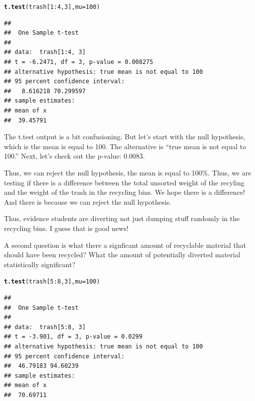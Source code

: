 \documentclass{tufte-handout}\usepackage[]{graphicx}\usepackage[]{color}
\makeatletter
\newcommand{\hlnum}[1]{\textcolor[rgb]{0.686,0.059,0.569}{#1}}%
\newcommand{\hlopt}[1]{\textcolor[rgb]{0,0,0}{#1}}%
\newcommand{\hlstd}[1]{\textcolor[rgb]{0.345,0.345,0.345}{#1}}%
\newcommand{\hlkwc}[1]{\textcolor[rgb]{0.333,0.667,0.333}{#1}}%
\newcommand{\hlkwd}[1]{\textcolor[rgb]{0.737,0.353,0.396}{\textbf{#1}}}%
\newenvironment{kframe}{%
 \def\at@end@of@kframe{}%
 \ifinner\ifhmode%
  \def\at@end@of@kframe{\end{minipage}}%
  \begin{minipage}{\columnwidth}%
 \fi\fi%
 \def\FrameCommand##1{\hskip\@totalleftmargin \hskip-\fboxsep
 \colorbox{shadecolor}{##1}\hskip-\fboxsep
     \hskip-\linewidth \hskip-\@totalleftmargin \hskip\columnwidth}%
 \MakeFramed {\advance\hsize-\width
   \@totalleftmargin\z@ \linewidth\hsize
   \@setminipage}}%
 {\par\unskip\endMakeFramed%
 \at@end@of@kframe}
\newenvironment{knitrout}{}{} %
\makeatother
\begin{document}
\begin{knitrout}
\color{fgcolor}\begin{kframe}
\begin{alltt}
\hlkwd{t.test}\hlstd{(trash[}\hlnum{1}\hlopt{:}\hlnum{4}\hlstd{,}\hlnum{3}\hlstd{],} \hlkwc{mu}\hlstd{=}\hlnum{100}\hlstd{)}
\end{alltt}
\begin{verbatim}
## 
## 	One Sample t-test
## 
## data:  trash[1:4, 3]
## t = -6.2471, df = 3, p-value = 0.008275
## alternative hypothesis: true mean is not equal to 100
## 95 percent confidence interval:
##   8.616218 70.299597
## sample estimates:
## mean of x 
##  39.45791
\end{verbatim}
\end{kframe}
\end{knitrout}

The t.test output is a bit confusioning. But let's start with the null hypothesis, which is the mean is equal to 100. The alternative is ``true mean is not equal to 100.'' Next, let's check out the p-value: 0.0083.

Thus, we can reject the null hypothesis, the mean is equal to 100\%. Thus, we are testing if there is a difference between the total unsorted weight of the recyling and the weight of the trash in the recycling bins. We hope there is a difference! And there is because we can reject the null hypothesis. 

Thus, evidence students are diverting not just dumping stuff randomly in the recycling bins. I guess that is good news!

A second question is what there a signficant amount of recyclable material that should have been recycled?  What the amount of potentially diverted material statistically significant?

\begin{knitrout}
\color{fgcolor}\begin{kframe}
\begin{alltt}
\hlkwd{t.test}\hlstd{(trash[}\hlnum{5}\hlopt{:}\hlnum{8}\hlstd{,}\hlnum{3}\hlstd{],} \hlkwc{mu}\hlstd{=}\hlnum{100}\hlstd{)}
\end{alltt}
\begin{verbatim}
## 
## 	One Sample t-test
## 
## data:  trash[5:8, 3]
## t = -3.901, df = 3, p-value = 0.0299
## alternative hypothesis: true mean is not equal to 100
## 95 percent confidence interval:
##  46.79183 94.60239
## sample estimates:
## mean of x 
##  70.69711
\end{verbatim}
\end{kframe}
\end{knitrout}
\end{document}

